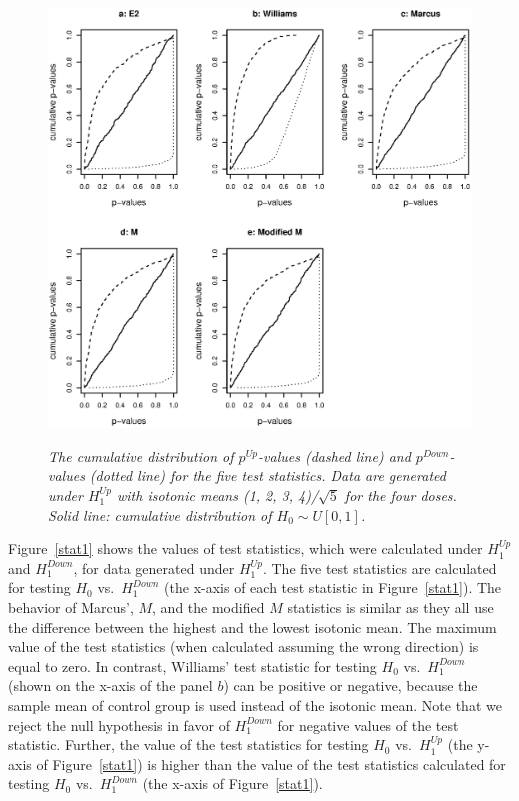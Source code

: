 \documentclass[10pt]{mybook4}
\begin{document}
\begin{figure}[!h]
\centering
{\includegraphics[width=.9\textwidth]{pupdn1b.eps}}
\caption{\em{The cumulative distribution of $p^{Up}$-values (dashed
line) and $p^{Down}$-values (dotted line) for the five test
statistics. Data are generated under $H_1^{Up}$ with isotonic means
(1, 2, 3, 4)/$\sqrt{5}$ for the four doses. Solid line: cumulative
distribution of $H_0\sim U[0,1]$.}} \label{pupdn1}
\end{figure}


Figure~\ref{stat1} shows the values of test statistics, which were
calculated under $H^{Up}_1$ and $H^{Down}_1$, for data generated
under $H^{Up}_1$. The five test statistics are calculated for
testing $H_0$ vs.\ $H^{Down}_1$ (the x-axis of each test statistic
in Figure~\ref{stat1}). The behavior of Marcus', $M$, and the
modified $M$ statistics is similar as they all use the difference
between the highest and the lowest isotonic mean.
The maximum value of the test statistics (when calculated assuming
the wrong direction) is equal to zero. In contrast, Williams' test
statistic for testing $H_0$ vs.\ $H^{Down}_1$ (shown on the x-axis
of the panel $b$) can be positive or negative, because the sample
mean of control group is used instead of the isotonic mean. Note
that we reject the null hypothesis in favor of $H^{Down}_1$ for
negative values of the test statistic. Further, the value of the
test statistics for testing $H_0$ vs.\ $H^{Up}_1$ (the y-axis of
Figure~\ref{stat1}) is higher than the value of the test statistics
calculated for testing $H_0$ vs.\ $H^{Down}_1$ (the x-axis of
Figure~\ref{stat1}).
\end{document}
